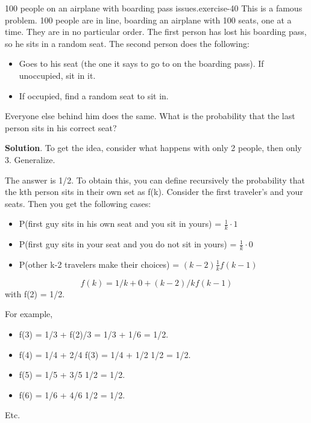 \documentclass[10pt,]{book}
\numberwithin{equation}{section}
\begin{document}
\begin{inlineexercise}{100 people on an airplane with boarding pass issues.}{exercise-40}%
\hypertarget{p-627}{}%
This is a famous problem.  100 people are in line, boarding an airplane with 100 seats, one at a time. They are in no particular order. The first person has lost his boarding pass, so he sits in a random seat. The second person does the following: \leavevmode%
\begin{itemize}[label=\textbullet]
\item{}Goes to his seat (the one it says to go to on the boarding pass). If unoccupied, sit in it.%
\item{}If occupied, find a random seat to sit in.%
\end{itemize}
 Everyone else behind him does the same. What is the probability that the last person sits in his correct seat?%
\par\smallskip%
\noindent\textbf{Solution}.\hypertarget{solution-17}{}\quad%
\hypertarget{p-628}{}%
To get the idea, consider what happens with only 2 people, then only 3. Generalize.%
\par
\hypertarget{p-629}{}%
The answer is 1/2. To obtain this, you can define recursively the probability that the kth person sits in their own set as f(k).  Consider the first traveler's and your seats. Then you get the following cases: \leavevmode%
\begin{itemize}[label=\textbullet]
\item{}P(first guy sits in his own seat and you sit in yours) = \(\frac{1}{k} \cdot 1\)%
\item{}P(first guy sits in your seat and you do not sit in yours) = \(\frac{1}{k} \cdot 0\)%
\item{}P(other k-2 travelers make their choices) = \((k-2) \frac{1}{k} f(k-1)\)%
\end{itemize}
%
\begin{equation*}
f(k) = 1/k + 0 + (k-2)/k f(k-1)
\end{equation*}
with f(2) = 1/2.%
\par
\hypertarget{p-630}{}%
For example, \leavevmode%
\begin{itemize}[label=\textbullet]
\item{}f(3) = 1/3 + f(2)/3 = 1/3 + 1/6 = 1/2.%
\item{}f(4) = 1/4 + 2/4 f(3) = 1/4 + 1/2 1/2 = 1/2.%
\item{}f(5) = 1/5 + 3/5 1/2 = 1/2.%
\item{}f(6) = 1/6 + 4/6 1/2 = 1/2.%
\end{itemize}
 Etc.%
\end{inlineexercise}
\end{document}
